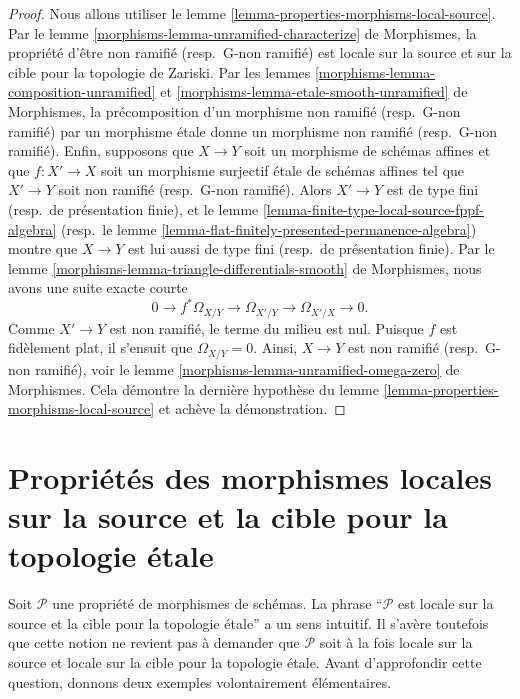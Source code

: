 \begin{proof}
Nous allons utiliser le
lemme \ref{lemma-properties-morphisms-local-source}.
Par le lemme \ref{morphisms-lemma-unramified-characterize} de Morphismes,
la propriété d'être non ramifié (resp.\ G-non ramifié)
est locale sur la source et sur la cible pour la topologie de Zariski. Par les
lemmes \ref{morphisms-lemma-composition-unramified} et
\ref{morphisms-lemma-etale-smooth-unramified} de Morphismes,
la précomposition d'un morphisme non ramifié (resp.\ G-non ramifié)
par un morphisme \'etale donne un morphisme non ramifié
(resp.\ G-non ramifié).
Enfin, supposons que $X \to Y$ soit un morphisme de schémas affines et que
$f : X' \to X$ soit un morphisme surjectif \'etale de schémas affines tel que
$X' \to Y$ soit non ramifié (resp.\ G-non ramifié).
Alors $X' \to Y$ est de type fini (resp.\ de présentation finie), et le
lemme \ref{lemma-finite-type-local-source-fppf-algebra}
(resp.\ le lemme \ref{lemma-flat-finitely-presented-permanence-algebra})
montre que $X \to Y$ est lui aussi de type fini
(resp.\ de présentation finie). Par
le lemme \ref{morphisms-lemma-triangle-differentials-smooth} de Morphismes,
nous avons une suite exacte courte
$$
0 \to f^*\Omega_{X/Y} \to \Omega_{X'/Y} \to \Omega_{X'/X} \to 0.
$$
Comme $X' \to Y$ est non ramifié, le terme du milieu est nul.
Puisque $f$ est fidèlement plat, il s'ensuit que $\Omega_{X/Y} = 0$.
Ainsi, $X \to Y$ est non ramifié (resp.\ G-non ramifié), voir le
lemme \ref{morphisms-lemma-unramified-omega-zero} de Morphismes.
Cela démontre la dernière hypothèse du
lemme \ref{lemma-properties-morphisms-local-source}
et achève la démonstration.
\end{proof}




\section[Localité source-cible (\'etale)]{Propriétés des morphismes locales sur la source et la cible pour la topologie \'etale}
\label{section-properties-etale-local-source-target}

\noindent
Soit $\mathcal{P}$ une propriété de morphismes de schémas. La phrase
``$\mathcal{P}$ est locale sur la source et la cible pour la topologie \'etale''
a un sens intuitif. Il s'avère toutefois que cette notion ne revient pas à
demander que $\mathcal{P}$ soit à la fois locale sur la source et locale sur
la cible pour la topologie \'etale.
Avant d'approfondir cette question, donnons deux exemples volontairement
élémentaires.

